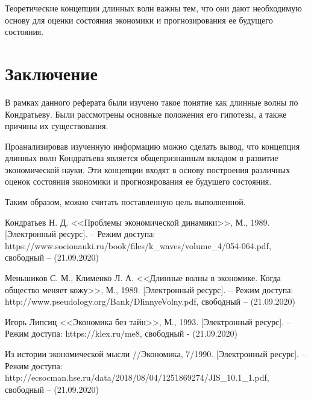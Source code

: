 \documentclass[a4paper,14pt]{extarticle}
\begin{document}
 	Теоретические концепции длинных волн важны тем, что они дают необходимую основу для оценки состояния экономики и прогнозирования ее будущего состояния.
 	
 	\newpage
 	\section{Заключение}
 	
 	В рамках данного реферата были изучено такое понятие как длинные волны по Кондратьеву. Были рассмотрены основные положения его гипотезы, а также причины их существования.
 	
 	Проанализировав изученную информацию можно сделать вывод, что концепция длинных волн Кондратьева является общепризнанным вкладом в развитие экономической науки. Эти концепции входят в основу построения различных оценок состояния экономики и прогнозирования ее будушего состояния.
 	
 	Таким образом, можно считать поставленную цель выполненной.
 	
 	\newpage
 
 	
 	\begin{thebibliography}{4}
 		Кондратьев Н. Д. <<Проблемы экономической динамики>>, М., 1989. [Электронный ресурс]. – Режим доступа: 
 		https://www.socionauki.ru/book/files/k\_waves/volume\_4/054-064.pdf, 
 		свободный – (21.09.2020)
 		
 		Меньшиков С. М., Клименко Л. А. <<Длинные волны в экономике. Когда общество меняет кожу>>, М., 1989. [Электронный ресурс]. – Режим доступа: 
 		http://www.pseudology.org/Bank/DlinnyeVolny.pdf, 
 		свободный – (21.09.2020)
 		
 		Игорь Липсиц <<Экономика без тайн>>, М., 1993. [Электронный ресурс]. – Режим доступа: https://klex.ru/me8, свободный - (21.09.2020)
 		
 		Из истории экономической мысли //Экономика, 7/1990. [Электронный ресурс]. – Режим доступа: http://ecsocman.hse.ru/data/2018/08/04/1251869274/JIS\_10.1\_1.pdf, 
 		свободный – (21.09.2020)
 		
 	\end{thebibliography}
 
\end{document}
